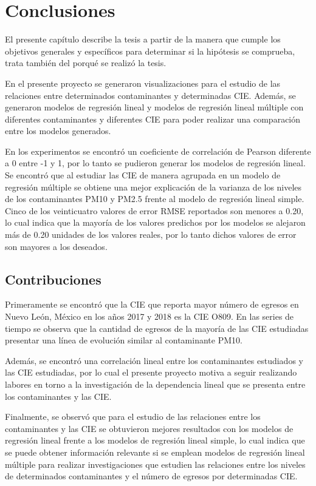 \chapter{Conclusiones}

El presente capítulo describe la tesis a partir de la manera que cumple los objetivos generales y específicos para determinar si la hipótesis se comprueba, trata también del porqué se realizó la tesis.

En el presente proyecto se generaron visualizaciones para el estudio de las relaciones entre determinados contaminantes y determinadas CIE. Además, se generaron modelos de regresión lineal y modelos de regresión lineal múltiple con diferentes contaminantes y diferentes CIE para poder realizar una comparación entre los modelos generados.

En los experimentos se encontró un coeficiente de correlación de Pearson diferente a 0 entre -1 y 1, por lo tanto se pudieron generar los modelos de regresión lineal. Se encontró que al estudiar las CIE de manera agrupada en un modelo de regresión múltiple se obtiene una mejor explicación de la varianza de los niveles de los contaminantes PM10 y PM2.5 frente al modelo de regresión lineal simple. Cinco de los veinticuatro valores de error RMSE reportados son menores a 0.20, lo cual indica que la mayoría de los valores predichos por los modelos se alejaron más de 0.20 unidades de los valores reales, por lo tanto dichos valores de error son mayores a los deseados.

\section{Contribuciones}
Primeramente se encontró que la CIE que reporta mayor número de egresos en Nuevo León, México en los años 2017 y 2018 es la CIE O809. En las series de tiempo se observa que la cantidad de egresos de la mayoría de las CIE estudiadas presentar una línea de evolución similar al contaminante PM10.

Además, se encontró una correlación lineal entre los contaminantes estudiados y las CIE estudiadas, por lo cual el presente proyecto motiva a seguir realizando labores en torno a la investigación de la dependencia lineal que se presenta entre los contaminantes y las CIE.

Finalmente, se observó que para el estudio de las relaciones entre los contaminantes y las CIE se obtuvieron mejores resultados con los modelos de regresión lineal frente a los modelos de regresión lineal simple, lo cual indica que se puede obtener información relevante si se emplean modelos de regresión lineal múltiple para realizar investigaciones que estudien las relaciones entre los niveles de determinados contaminantes y el número de egresos por determinadas CIE.

